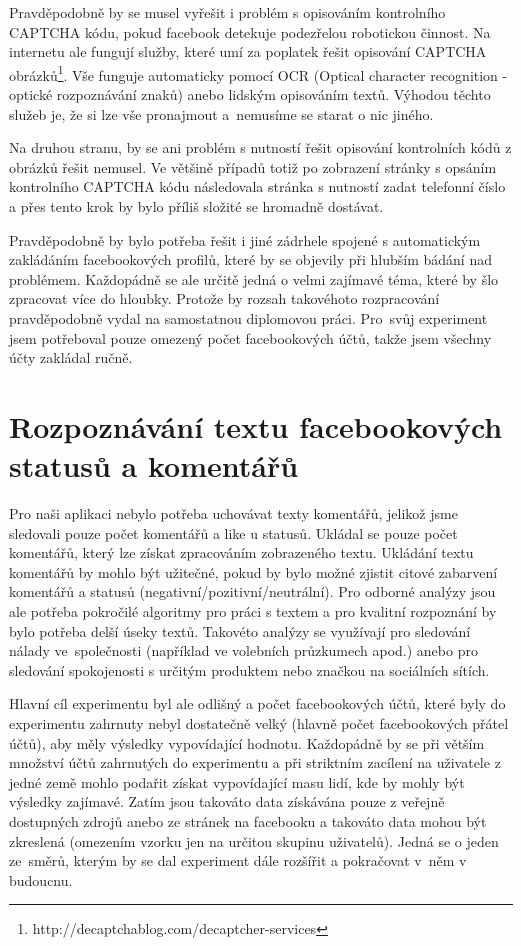 \documentclass[thesis=M,czech]{FITthesis}[2013/05/10]
\begin{document}
Pravděpodobně by se musel vyřešit i problém s opisováním kontrolního CAPTCHA kódu, pokud facebook detekuje podezřelou robotickou činnost. Na internetu ale fungují služby, které umí za poplatek řešit opisování CAPTCHA obrázků\footnote{http://decaptchablog.com/decaptcher-services}. Vše funguje automaticky pomocí OCR (Optical character recognition - optické rozpoznávání znaků) anebo lidským opisováním textů. Výhodou těchto služeb je, že si lze vše pronajmout a~nemusíme se starat o nic jiného. 

Na druhou stranu, by se ani problém s nutností řešit opisování kontrolních kódů z obrázků řešit nemusel. Ve většině případů totiž po zobrazení stránky s opsáním kontrolního CAPTCHA kódu následovala stránka s nutností zadat telefonní číslo a přes tento krok by bylo příliš složité se hromadně dostávat.

Pravděpodobně by bylo potřeba řešit i jiné zádrhele spojené s automatickým zakládáním facebookových profilů, které by se objevily při hlubším bádání nad problémem. Každopádně se ale určitě jedná o velmi zajímavé téma, které by šlo zpracovat více do hloubky. Protože by rozsah takovéhoto rozpracování pravděpodobně vydal na samostatnou diplomovou práci. Pro~svůj experiment jsem potřeboval pouze omezený počet facebookových účtů, takže jsem všechny účty zakládal ručně.

\section{Rozpoznávání textu facebookových statusů a komentářů}

Pro naši aplikaci nebylo potřeba uchovávat texty komentářů, jelikož jsme sledovali pouze počet komentářů a like u statusů. Ukládal se pouze počet komentářů, který lze získat zpracováním zobrazeného textu. Ukládání textu komentářů by mohlo být užitečné, pokud by bylo možné zjistit citové zabarvení komentářů a statusů (negativní/pozitivní/neutrální). Pro odborné analýzy jsou ale potřeba pokročilé algoritmy pro práci s textem a pro kvalitní rozpoznání by bylo potřeba delší úseky textů. Takovéto analýzy se využívají pro sledování nálady ve~společnosti (například ve volebních průzkumech apod.) anebo pro sledování spokojenosti s určitým produktem nebo značkou na sociálních sítích. 

Hlavní cíl experimentu byl ale odlišný a počet facebookových účtů, které byly do experimentu zahrnuty nebyl dostatečně velký (hlavně počet facebookových přátel účtů), aby měly výsledky vypovídající hodnotu. Každopádně by se při větším množství účtů zahrnutých do experimentu a při striktním zacílení na uživatele z jedné země mohlo podařit získat vypovídající masu lidí, kde by mohly být výsledky zajímavé. Zatím jsou takováto data získávána pouze z veřejně dostupných zdrojů anebo ze stránek na facebooku a takováto data mohou být zkreslená (omezením vzorku jen na určitou skupinu uživatelů). Jedná se o jeden ze~směrů, kterým by se dal experiment dále rozšířit a pokračovat v~něm v budoucnu.
\end{document}
